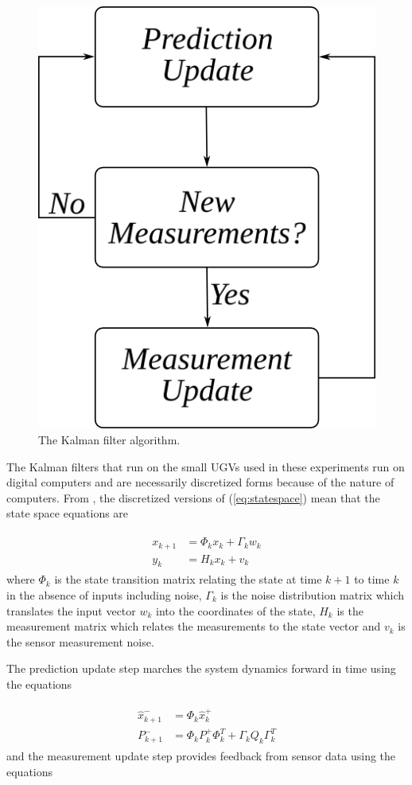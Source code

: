 \begin{figure}[ht!]
	\centering
	\includegraphics[width=.4\textwidth]{images/kf}
	\caption{The Kalman filter algorithm.}
	\label{fig:kf}
\end{figure}

The Kalman filters that run on the small UGVs used in these experiments run on digital computers and are necessarily discretized forms because of the nature of computers. From \cite{Kelly_1994_338}, \cite{Simon06OptimalEstimation} the discretized versions of (\ref{eq:statespace}) mean that the state space equations are

\begin{align}
\label{eq:kfstatemodel}
\begin{split}
x_{k+1} &= \Phi_kx_k + \Gamma_kw_k \\
y_k &= H_kx_k + v_k
\end{split}
\end{align}
where $\Phi_k$ is the state transition matrix relating the state at time $k+1$ to time $k$ in the absence of inputs including noise, $\Gamma_k$ is the noise distribution matrix which translates the input vector $w_k$ into the coordinates of the state, $H_k$ is the measurement matrix which relates the measurements to the state vector and $v_k$ is the sensor measurement noise.

The prediction update step marches the system dynamics forward in time using the equations

\begin{align}
\label{eq:kfpredictionupdate}
\begin{split}
\hat{x}_{k+1}^- &= \Phi_k\hat{x}_k^+ \\
P_{k+1}^- &= \Phi_kP_k^+\Phi_k^T + \Gamma_kQ_k\Gamma_k^T
\end{split}
\end{align}
and the measurement update step provides feedback from sensor data using the equations

